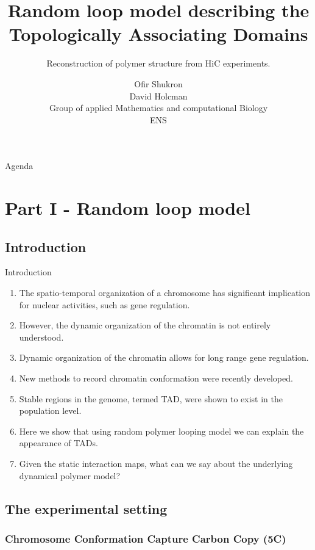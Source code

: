 \documentclass[8pt]{beamer}
\title{ Random loop model describing the Topologically Associating Domains}
\subtitle{Reconstruction of polymer structure from HiC experiments.}
\author{Ofir Shukron\\
David Holcman\\
Group of applied Mathematics and computational Biology\\
ENS}
\begin{document}
\begin{frame} %
\titlepage
\end{frame}

\begin{frame}{Agenda}
\tableofcontents
\end{frame}
\section{ Part I - Random loop model}

\subsection{Introduction}\label{subsection_introduction}

\begin{frame}{Introduction}
\begin{enumerate}
\item The spatio-temporal organization of a chromosome has significant implication for nuclear activities, such as gene regulation. 
\item However, the dynamic organization of the chromatin is not entirely understood.
\item Dynamic organization of the chromatin allows for long range gene regulation.
\item New methods to record chromatin conformation were recently developed. 
\item Stable regions in the genome, termed TAD, were shown to exist in the population level. 
\item Here we show that using random polymer looping model we can explain the appearance of TADs.
\item Given the static interaction maps, what can we say about the underlying dynamical polymer model?
\end{enumerate}
\end{frame}

\subsection{The experimental setting}\label{subsection_theExperimentalSetting}

\subsubsection{Chromosome Conformation Capture Carbon Copy (5C)}\label{subsubsection_chromosomeConformationCaptureExperiments}
\end{document}
